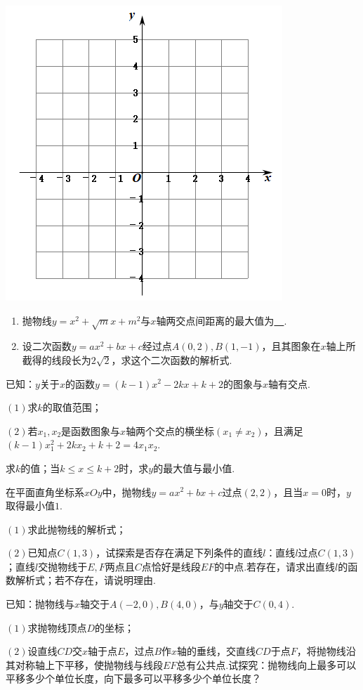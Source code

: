 \documentclass[10pt]{ctexart}
\begin{document}
\includegraphics[scale=0.6]{figure/g-18.PNG} 
\begin{jply}{}{}
   \begin{enumerate}[(1)]
   \item 抛物线$y=x^2+\sqrt{m}x+m^2$与$x$轴两交点间距离的最大值为\underline{~\hspace{1cm}~}.
   \item 设二次函数$y=ax^2+bx+c$经过点$A(0,2),B(1,-1)$，且其图象在$x$轴上所截得的线段长为$2\sqrt{2}$，求这个二次函数的解析式.
   \end{enumerate}
\end{jply}
\begin{jply}{}{}
  已知：$y$关于$x$的函数$y=(k-1)x^2-2kx+k+2$的图象与$x$轴有交点.
  
  $(1)$求$k$的取值范围；
  
  $(2)$若$x_1,x_2$是函数图象与$x$轴两个交点的横坐标$(x_1\neq x_2)$，且满足$(k-1)x^2_1+2kx_2+k+2=4x_1x_2$.
  
  求$k$的值；当$k\leqslant x\leqslant k+2$时，求$y$的最大值与最小值.
\end{jply}
\begin{jply}{}{}
  在平面直角坐标系$xOy$中，抛物线$y=ax^2+bx+c$过点$(2,2)$，且当$x=0$时，$y$取得最小值$1$.
  
  $(1)$求此抛物线的解析式；
  
  $(2)$已知点$C(1,3)$，试探索是否存在满足下列条件的直线$l$：直线$l$过点$C(1,3)$；直线$l$交抛物线于$E,F$两点且$C$点恰好是线段$EF$的中点.若存在，请求出直线$l$的函数解析式；若不存在，请说明理由.
\end{jply}
\begin{jply}{}{}
   已知：抛物线与$x$轴交于$A(-2,0),B(4,0)$，与$y$轴交于$C(0,4)$.
   
   $(1)$求抛物线顶点$D$的坐标；
   
   $(2)$设直线$CD$交$x$轴于点$E$，过点$B$作$x$轴的垂线，交直线$CD$于点$F$，将抛物线沿其对称轴上下平移，使抛物线与线段$EF$总有公共点.试探究：抛物线向上最多可以平移多少个单位长度，向下最多可以平移多少个单位长度？
\end{jply}
\end{document}
